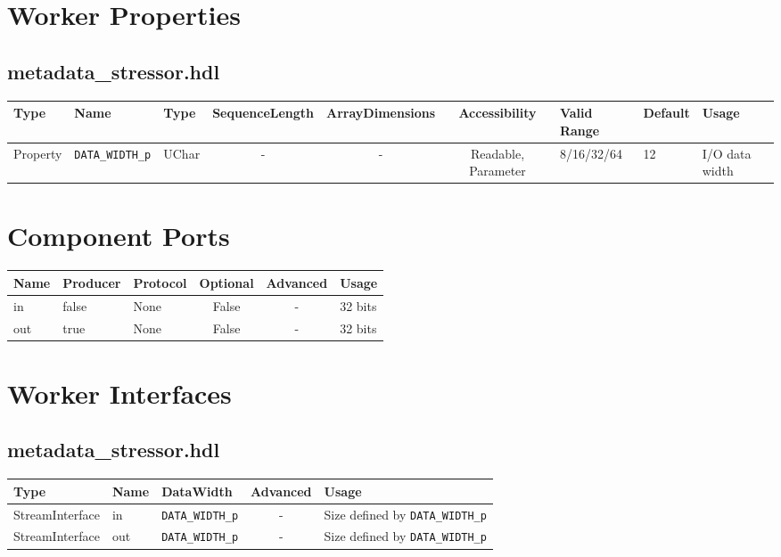 \documentclass{article}
\def\comp{metadata\_stressor}
\begin{document}
\begin{landscape}
\section*{Worker Properties}
\subsection*{\comp.hdl}
\begin{scriptsize}
	\begin{tabular}{|p{1.5cm}|p{2.5cm}|p{1cm}|c|c|c|p{2cm}|p{1cm}|p{5cm}|}
		\hline
		\rowcolor{blue}
		Type     & Name                      & Type  & SequenceLength & ArrayDimensions & Accessibility       & Valid Range & Default & Usage                                      \\
		\hline
		Property & \verb+DATA_WIDTH_p+   & UChar & -              & -               & Readable, Parameter & 8/16/32/64        & 12      & I/O data width                   \\
		\hline
	\end{tabular}
\end{scriptsize}

\section*{Component Ports}
\begin{scriptsize}
\begin{tabular}{|M{2cm}|M{1.5cm}|M{4cm}|c|c|M{9cm}|}
\hline
{}
Name & Producer & Protocol & Optional & Advanced & Usage
\\
\hline
in & false & None& False & - & 32 bits\\
\hline
out & true & None& False & - & 32 bits\\
\hline
\end{tabular}
\end{scriptsize}

\section*{Worker Interfaces}
\subsection*{\comp.hdl}
\begin{scriptsize}
	\begin{tabular}{|M{2cm}|M{1.5cm}|M{4cm}|c|M{12cm}|}
		\hline
		Type            & Name & DataWidth            & Advanced & Usage                                       \\
		\hline
		StreamInterface & in   & \verb+DATA_WIDTH_p+ & -        & Size defined by \verb+DATA_WIDTH_p+        \\
		\hline
		StreamInterface & out  & \verb+DATA_WIDTH_p+ & -        & Size defined by \verb+DATA_WIDTH_p+ \\
		\hline
	\end{tabular}
\end{scriptsize}
\end{landscape}
\end{document}
